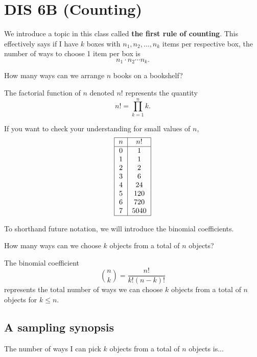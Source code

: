 \section{DIS 6B (Counting)}

We introduce a topic in this class called \textbf{the first rule of counting}. This effectively says if I have $k$ boxes with $n_1, n_2, \ldots, n_k$ items per respective box, the number of ways to choose 1 item per box is \[ n_1 \cdot n_2 \cdots n_k. \] 

\begin{example}
    How many ways can we arrange $n$ books on a bookshelf?
\end{example}

\begin{definition}[factorial]
    The factorial function of $n$ denoted $n!$ represents the quantity \[ n! = \prod_{k=1}^{n} k. \]
\end{definition}

If you want to check your understanding for small values of $n$, 
\[ \begin{tabular}{|c|c|}
    \hline
    $n$ & $n!$ \\
    \hline
    0 & 1 \\
    1 & 1 \\
    2 & 2 \\
    3 & 6 \\
    4 & 24 \\
    5 & 120 \\
    6 & 720 \\
    7 & 5040 \\
    \hline
\end{tabular} \]

To shorthand future notation, we will introduce the binomial coefficients. 

How many ways can we choose $k$ objects from a total of $n$ objects? 

\begin{definition}
    The binomial coefficient \[ \binom{n}{k} = \frac{n!}{k!(n-k)!} \] represents the total number of ways we can choose $k$ objects from a total of $n$ objects for $k \le n$. 
\end{definition}


\subsection{A sampling synopsis}
The number of ways I can pick $k$ objects from a total of $n$ objects is... 

